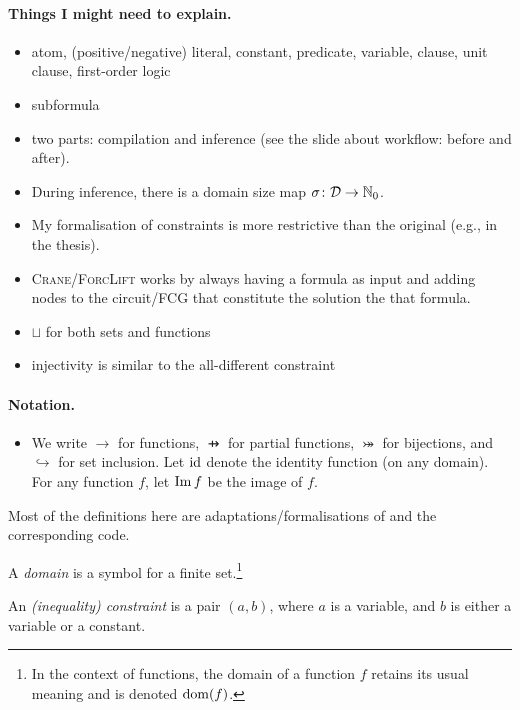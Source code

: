 \paragraph{Things I might need to explain.}
\begin{itemize}
\item atom, (positive/negative) literal, constant, predicate, variable, clause, unit clause, first-order logic
\item subformula
\item two parts: compilation and inference (see the slide about workflow: before and after).
\item During inference, there is a domain size map $\operatorname{\sigma}\colon \mathcal{D} \to \mathbb{N}_0$.
\item My formalisation of constraints is more restrictive than the original (e.g., in the thesis).
\item \textsc{Crane/ForcLift} works by always having a formula as input and adding nodes to the circuit/FCG that constitute the solution the that formula.
\item $\sqcup$ for both sets and functions
\item injectivity is similar to the all-different constraint
\end{itemize}

\paragraph{Notation.}
\begin{itemize}
\item We write $\to$ for functions, $\pfun$ for partial functions, $\twoheadrightarrowtail$ for bijections, and $\hookrightarrow$ for set inclusion. Let $\operatorname{id}$ denote the identity function (on any domain). For any function $f$, let $\operatorname{Im} f$ be the image of $f$.
\end{itemize}

Most of the definitions here are adaptations/formalisations of \citep{DBLP:conf/ijcai/BroeckTMDR11} and the corresponding code.

\begin{definition}
  A \emph{domain} is a symbol for a finite set.\footnote{In the context of functions, the domain of a function $f$ retains its usual meaning and is denoted $\operatorname{dom}(f)$.}
\end{definition}

\begin{definition}
  An \emph{(inequality) constraint} is a pair $(a, b)$, where $a$ is a variable, and $b$ is either a variable or a constant.
\end{definition}

